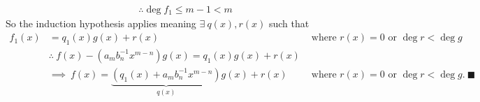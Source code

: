 \begin{lemma}
\begin{align}
    &\therefore \deg f_1 \leq m-1 < m \nonumber
\end{align}
So the induction hypothesis applies meaning $\exists \ q(x), r(x)$ such that
\begin{align}
    f_1(x) &= q_1(x)g(x)+r(x) \ \  &\text{ where }r(x)=0 \text{ or } \deg r < \deg g \ \ \ \ \nonumber \\
    &\therefore \ f(x) - (a_m b_n^{-1}x^{m-n})g(x) = q_1(x)g(x) + r(x) &\nonumber \\
    &\implies \ f(x) = \underbrace{(q_1(x)+ a_m b_n^{-1}x^{m-n})}_{q(x)}g(x)+r(x) \ \ \ &\text{ where }r(x)=0 \text{ or } \deg r < \deg g. \ \blacksquare \nonumber
\end{align}



\end{lemma}
